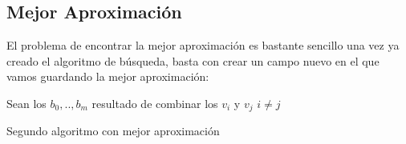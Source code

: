 \subsection{Mejor Aproximación}
El problema de encontrar la mejor aproximación es bastante sencillo una vez
ya creado el algoritmo de búsqueda, basta con crear un campo nuevo en el que
vamos guardando la mejor aproximación:
\vspace{0.25cm}

\begin{algorithm}[H]
 \hspace{0.25cm}	Sean los $b_0,..,b_{m}$ resultado de combinar los $v_i$ y $v_j$ $i \neq j$  \;
\caption{Segundo algoritmo con mejor aproximación}
\end{algorithm}
